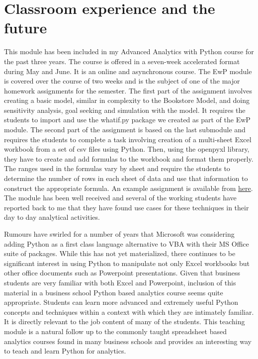 \documentclass[ited,blindrev]{informs3}              %
\begin{document}
\section{Classroom experience and the future}

This module has been included in my Advanced Analytics with Python course for the past three years. The course is offered in a seven-week accelerated format during May and June. It is an online and asynchronous course. The EwP module is covered over the course of two weeks and is the subject of one of the major homework assignments for the semester. The first part of the assignment involves creating a basic model, similar in complexity to the Bookstore Model, and doing sensitivity analysis, goal seeking and simulation with the model. It requires the students to import and use the whatif.py package we created as part of the EwP module. The second part of the assignment is based on the last submodule and requires the students to complete a task involving creation of a multi-sheet Excel workbook from a set of csv files using Python. Then, using the openpyxl library, they have to create and add formulas to the workbook and format them properly. The ranges used in the formulas vary by sheet and require the students to determine the number of rows in each sheet of data and use that information to construct the appropriate formula. An example assignment is available from \href{}{here}. The module has been well received and several of the working students have reported back to me that they have found use cases for these techniques in their day to day analytical activities.

Rumours have swirled for a number of years that Microsoft was considering adding Python as a first class language alternative to VBA with their MS Office suite of packages. While this has not yet materialized, there continues to be significant interest in using Python to manipulate not only Excel workbooks but other office documents such as Powerpoint presentations. Given that business students are very familiar with both Excel and Powerpoint, inclusion of this material in a business school Python based analytics course seems quite appropriate. Students can learn more advanced and extremely useful Python concepts and techniques within a context with which they are intimately familiar. It is directly relevant to the job content of many of the students. This teaching module is a natural follow up to the commonly taught spreadsheet based analytics courses found in many business schools and provides an interesting way to teach and learn Python for analytics.
\end{document}
